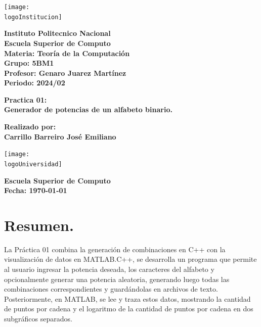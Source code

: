 \documentclass{article}
\newcommand{\logoInstitucion}{logotipo_ipn.png} %
\newcommand{\logoUniversidad}{EscudoESCOM.png} %
\newcommand{\nombreInstituto}{Instituto Politecnico Nacional}
\newcommand{\facultad}{Escuela Superior de Computo}
\newcommand{\materia}{Teoría de la Computación}
\newcommand{\grupo}{5BM1}
\newcommand{\profesora}{Genaro Juarez Martínez}
\newcommand{\periodo}{2024/02}
\newcommand{\alumno}{Carrillo Barreiro José Emiliano}
\begin{document}
\begin{titlepage}
    \begin{center}
        \vspace*{1cm}

        \texttt{[image: \\logoInstitucion]}

        \vspace{1cm}

        \textbf{\LARGE \nombreInstituto} \\
        \textbf{\Large \facultad} \\
        \vspace{0.5cm}
        \textbf{\large Materia: \materia} \\
        \textbf{\large Grupo: \grupo} \\
        \vspace{0.5cm}
        \textbf{\large Profesor: \profesora} \\
        \textbf{\large Periodo: \periodo} \\

        \vspace{1cm}

        \textbf{\LARGE Practica 01:} \\
        \vspace{0.5cm}
        \textbf{\Large Generador de potencias de un alfabeto binario.} \\

        \vfill

        \textbf{\large Realizado por:} \\
        \textbf{\large \alumno}

        \vspace{1cm}

        \texttt{[image: \\logoUniversidad]}

        \vspace{1cm}

        \textbf{\large \facultad} \\
        \textbf{\large Fecha: \today}

    \end{center}
\end{titlepage}

\tableofcontents
\newpage
\listofcpplistings%
\listofmatlablistings%
\listoffigures
\newpage

\section{Resumen.}
La Práctica 01 combina la generación de combinaciones en C++ con la visualización de datos en MATLAB.\@En C++, se desarrolla un
programa que permite al usuario ingresar la potencia deseada, los caracteres del alfabeto y opcionalmente generar una potencia
aleatoria, generando luego todas las combinaciones correspondientes y guardándolas en archivos de texto. Posteriormente, en MATLAB, se
lee y traza estos datos, mostrando la cantidad de puntos por cadena y el logaritmo de la cantidad de puntos por cadena en dos
subgráficos separados.
\end{document}
